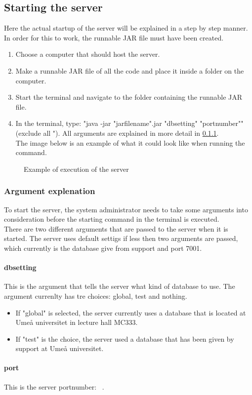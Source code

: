 \subsection{Starting the server}
Here the actual startup of the server will be explained in a step by step manner.
In order for this to work, the runnable JAR file must have been created.
\begin{enumerate}
\item Choose a computer that should host the server.
\item Make a runnable JAR file of all the code and place it inside a folder on the computer.
\item Start the terminal and navigate to the folder containing the runnable JAR file.
\item In the terminal, type: "java -jar "jarfilename".jar "dbsetting" "portnumber"" (exclude all "). All arguments are explained in more detail in \ref{sec:com_ArgExpl}.\\ 
The image  below is an example of what it could look like when running the command. 
\end{enumerate}
\begin{figure}[h]
\caption{Example of execution of the server}
\label{fig:com_runserverterminal}
\end{figure}

\subsubsection{Argument explenation}
\label{sec:com_ArgExpl}
To start the server, the system administrator needs to take some arguments into consideration before the starting command in the terminal is executed.\\
There are two different arguments that are passed to the server when it is started.
The server uses default settigs if less then two arguments are passed, which currently is the database give from support and port 7001.

\paragraph{dbsetting}
This is the argument that tells the server what kind of database to use.
The argument currenlty has tre choices: global, test and nothing. 

\begin{itemize}
\item If "global" is selected, the server currently uses a database that is located at Umeå universitet in lecture hall MC333.
\item If "test" is the choice, the server used a database that has been given by support at Umeå universitet. 
\end{itemize}

\paragraph{port}
This is the server portnumber: \serverPort\ .
